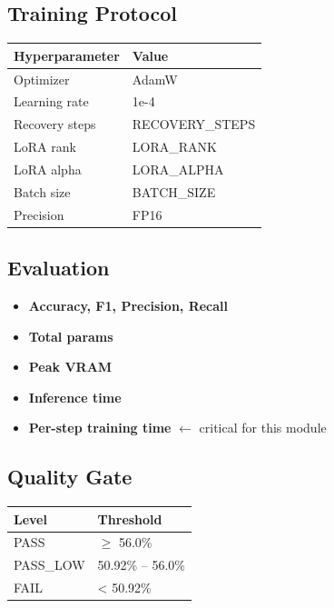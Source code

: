 \subsection{Training Protocol}

\begin{table}[H]
\centering
\small
\begin{tabular}{ll}
\toprule
\textbf{Hyperparameter} & \textbf{Value} \\
\midrule
Optimizer & AdamW \\
Learning rate & 1e-4 \\
Recovery steps & {{RECOVERY\_STEPS}} \\
LoRA rank & {{LORA\_RANK}} \\
LoRA alpha & {{LORA\_ALPHA}} \\
Batch size & {{BATCH\_SIZE}} \\
Precision & FP16 \\
\bottomrule
\end{tabular}
\end{table}

\subsection{Evaluation}

\begin{itemize}
\item \textbf{Accuracy, F1, Precision, Recall}
\item \textbf{Total params}
\item \textbf{Peak VRAM}
\item \textbf{Inference time}
\item \textbf{Per-step training time} $\leftarrow$ critical for this module

\end{itemize}
\subsection{Quality Gate}

\begin{table}[H]
\centering
\small
\begin{tabular}{ll}
\toprule
\textbf{Level} & \textbf{Threshold} \\
\midrule
PASS & $\ge$ 56.0\% \\
PASS\_LOW & 50.92\% -- 56.0\% \\
FAIL & < 50.92\% \\
\bottomrule
\end{tabular}
\end{table}

